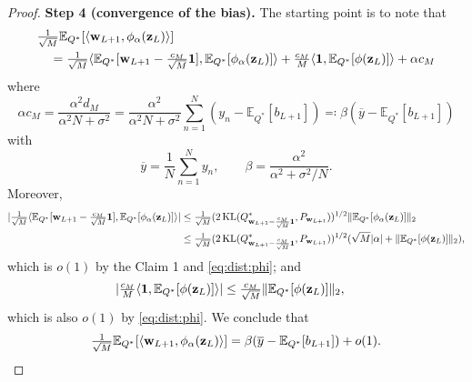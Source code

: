 \documentclass[twoside]{article}
\newcommand{\vw}{\mathbf{w}}
\newcommand{\vz}{\mathbf{z}}
\newcommand{\vone}{\mathbf{1}}
\newcommand{\E}{\mathbb{E}}
\newcommand{\KL}{\operatorname{KL}}
\DeclarePairedDelimiter\lra{\langle}{\rangle}    %
\DeclarePairedDelimiter\norm{\|}{\|}             %
\DeclarePairedDelimiter\abs{|}{|}                %
\theoremstyle{theoremstyle}
\begin{document}
\begin{proof}
    \textbf{Step 4 (convergence of the bias).}
    The starting point is to note that
    \begin{align}
        &\tfrac{1}{\sqrt{M}}
        \E_{Q^*}[\lra{\vw_{L+1}, \phi_\alpha(\vz_{L})}] \nonumber \\
        &\quad=
            \tfrac{1}{\sqrt{M}}
            \lra{\E_{Q^*}[\vw_{L+1} - \tfrac{c_M}{\sqrt{M}} \vone],\E_{Q^*}[\phi_\alpha(\vz_{L})]}
            +
            \tfrac{c_M}{M}
            \lra{\vone,\E_{Q^*}[\phi(\vz_{L})]}
            + \alpha c_M
    \end{align}
    where
    \begin{equation}
        \alpha c_M
        = \frac{\alpha^2 d_M}{\alpha^2 N + \sigma^2}
        = \frac{\alpha^2}{\alpha^2 N + \sigma^2} \sum_{n=1}^N (y_n - \E_{Q^*}[b_{L+1}])
        \eqqcolon
        \beta ( \overline{y} - \E_{Q^*}[b_{L+1}])
    \end{equation}
    with
    \begin{equation}
        \overline{y} = \frac1N\sum_{n=1}^N y_n,
        \qquad
        \beta = \frac{\alpha^2}{\alpha^2 + \sigma^2 / N}.
    \end{equation}
    Moreover,
    \begin{align*}
        \abs{
            \tfrac{1}{\sqrt{M}}
            \lra{\E_{Q^*}[\vw_{L+1} - \tfrac{c_M}{\sqrt{M}} \vone],\E_{Q^*}[\phi_\alpha(\vz_{L})]}
        }
        &\le \tfrac{1}{\sqrt{M}} (2\KL(Q^*_{\vw_{L+1} - \frac{c_M}{\sqrt{M}} \vone}, P_{\vw_{L+1}}))^{1/2} \norm{\E_{Q^*}[\phi_\alpha(\vz_{L})]}_2 \\
        &\le \tfrac{1}{\sqrt{M}} (2\KL(Q^*_{\vw_{L+1} - \frac{c_M}{\sqrt{M}}\vone}, P_{\vw_{L+1}}))^{1/2} (\sqrt{M} \abs{\alpha} + \norm{\E_{Q^*}[\phi(\vz_{L})]}_2),
    \end{align*}
    which is $o(1)$ by the Claim 1 and \cref{eq:dist:phi}; and
    \begin{align*}
        \abs{
            \tfrac{c_M}{M}
            \lra{\vone,\E_{Q^*}[\phi(\vz_{L})]}
        }
        &\le \tfrac{c_M}{\sqrt{M}} \norm{\E_{Q^*}[\phi(\vz_{L})]}_2,
    \end{align*}
    which is also $o(1)$ by \cref{eq:dist:phi}.
    We conclude that 
    \begin{equation}
        \tfrac{1}{\sqrt{M}}
        \E_{Q^*}[\lra{\vw_{L+1}, \phi_\alpha(\vz_{L})}]
        = \beta ( \overline{y} - \E_{Q^*}[b_{L+1}]) + o(1).
    \end{equation}
    

\end{proof}
\end{document}
